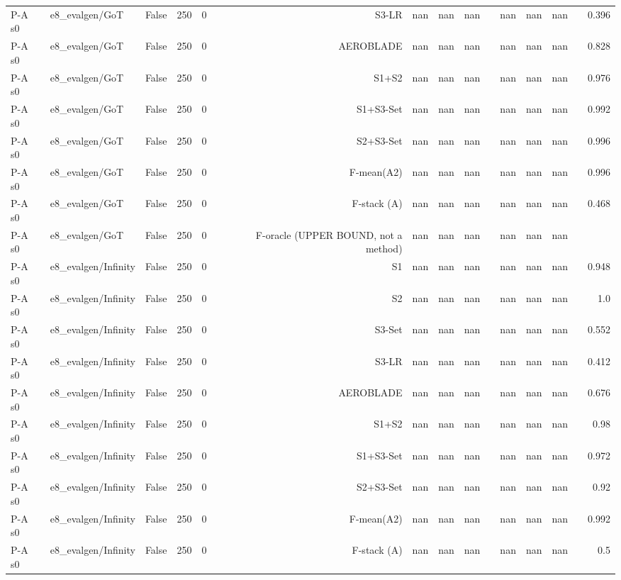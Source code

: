 \begin{table}[htbp]
\begin{tabular}{llrrrrrrrrrrrrr}
P-A s0 & e8\_evalgen/GoT & False & 250 & 0 & S3-LR & nan & nan & nan &  & nan & nan & nan &  & 0.396 \\
P-A s0 & e8\_evalgen/GoT & False & 250 & 0 & AEROBLADE & nan & nan & nan &  & nan & nan & nan &  & 0.828 \\
P-A s0 & e8\_evalgen/GoT & False & 250 & 0 & S1+S2 & nan & nan & nan &  & nan & nan & nan &  & 0.976 \\
P-A s0 & e8\_evalgen/GoT & False & 250 & 0 & S1+S3-Set & nan & nan & nan &  & nan & nan & nan &  & 0.992 \\
P-A s0 & e8\_evalgen/GoT & False & 250 & 0 & S2+S3-Set & nan & nan & nan &  & nan & nan & nan &  & 0.996 \\
P-A s0 & e8\_evalgen/GoT & False & 250 & 0 & F-mean(A2) & nan & nan & nan &  & nan & nan & nan &  & 0.996 \\
P-A s0 & e8\_evalgen/GoT & False & 250 & 0 & F-stack (A) & nan & nan & nan &  & nan & nan & nan &  & 0.468 \\
P-A s0 & e8\_evalgen/GoT & False & 250 & 0 & F-oracle (UPPER BOUND, not a method) & nan & nan & nan &  & nan & nan & nan &  &  \\
P-A s0 & e8\_evalgen/Infinity & False & 250 & 0 & S1 & nan & nan & nan &  & nan & nan & nan &  & 0.948 \\
P-A s0 & e8\_evalgen/Infinity & False & 250 & 0 & S2 & nan & nan & nan &  & nan & nan & nan &  & 1.0 \\
P-A s0 & e8\_evalgen/Infinity & False & 250 & 0 & S3-Set & nan & nan & nan &  & nan & nan & nan &  & 0.552 \\
P-A s0 & e8\_evalgen/Infinity & False & 250 & 0 & S3-LR & nan & nan & nan &  & nan & nan & nan &  & 0.412 \\
P-A s0 & e8\_evalgen/Infinity & False & 250 & 0 & AEROBLADE & nan & nan & nan &  & nan & nan & nan &  & 0.676 \\
P-A s0 & e8\_evalgen/Infinity & False & 250 & 0 & S1+S2 & nan & nan & nan &  & nan & nan & nan &  & 0.98 \\
P-A s0 & e8\_evalgen/Infinity & False & 250 & 0 & S1+S3-Set & nan & nan & nan &  & nan & nan & nan &  & 0.972 \\
P-A s0 & e8\_evalgen/Infinity & False & 250 & 0 & S2+S3-Set & nan & nan & nan &  & nan & nan & nan &  & 0.92 \\
P-A s0 & e8\_evalgen/Infinity & False & 250 & 0 & F-mean(A2) & nan & nan & nan &  & nan & nan & nan &  & 0.992 \\
P-A s0 & e8\_evalgen/Infinity & False & 250 & 0 & F-stack (A) & nan & nan & nan &  & nan & nan & nan &  & 0.5 \\

\end{tabular}
\end{table}
